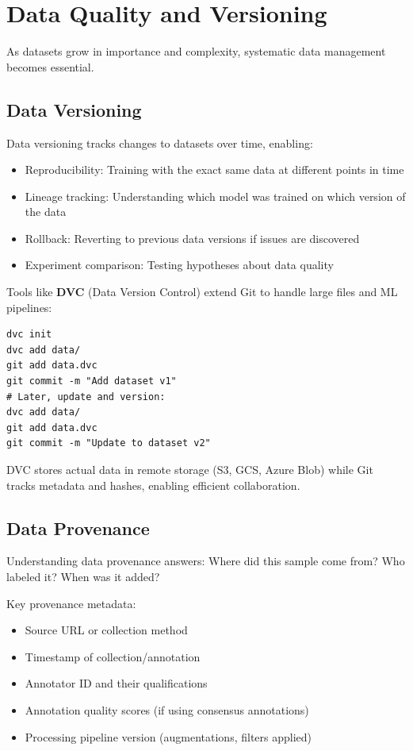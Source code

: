 \section{Data Quality and Versioning}

As datasets grow in importance and complexity, systematic data management becomes essential.

\subsection{Data Versioning}

Data versioning tracks changes to datasets over time, enabling:
\begin{itemize}
    \item Reproducibility: Training with the exact same data at different points in time
    \item Lineage tracking: Understanding which model was trained on which version of the data
    \item Rollback: Reverting to previous data versions if issues are discovered
    \item Experiment comparison: Testing hypotheses about data quality
\end{itemize}

Tools like \textbf{DVC} (Data Version Control) extend Git to handle large files and ML pipelines:
\begin{verbatim}
dvc init
dvc add data/
git add data.dvc
git commit -m "Add dataset v1"
# Later, update and version:
dvc add data/
git add data.dvc
git commit -m "Update to dataset v2"
\end{verbatim}

DVC stores actual data in remote storage (S3, GCS, Azure Blob) while Git tracks metadata and hashes, enabling efficient collaboration.

\subsection{Data Provenance}

Understanding data provenance answers: Where did this sample come from? Who labeled it? When was it added?

Key provenance metadata:
\begin{itemize}
    \item Source URL or collection method
    \item Timestamp of collection/annotation
    \item Annotator ID and their qualifications
    \item Annotation quality scores (if using consensus annotations)
    \item Processing pipeline version (augmentations, filters applied)
\end{itemize}

